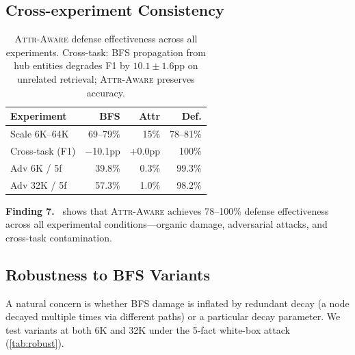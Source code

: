 \documentclass{article}
\newcommand{\attraware}{\textsc{Attr-Aware}}
\newcommand{\finding}[1]{\vspace{2pt}\noindent\textbf{Finding #1.}~}
\begin{document}
\subsection{Cross-experiment Consistency}

\begin{table}[htbp]
\centering
\footnotesize
\begin{tabular}{lrrr}
\toprule
\textbf{Experiment} & \textbf{BFS} & \textbf{Attr} & \textbf{Def.} \\
\midrule
Scale 6K--64K & 69--79\% & 15\% & 78--81\% \\
Cross-task (F1) & $-$10.1pp & +0.0pp & 100\% \\
Adv 6K / 5f & 39.8\% & 0.3\% & 99.3\% \\
Adv 32K / 5f & 57.3\% & 1.0\% & 98.2\% \\
\bottomrule
\end{tabular}
\caption{\attraware{} defense effectiveness across all experiments. Cross-task: BFS propagation from hub entities degrades F1 by $10.1\pm1.6$pp on unrelated retrieval; \attraware{} preserves accuracy.}
\label{tab:defense_all}
\end{table}

\finding{7}  shows that \attraware{} achieves 78--100\% defense effectiveness across all experimental conditions---organic damage, adversarial attacks, and cross-task contamination.

\subsection{Robustness to BFS Variants}

A natural concern is whether BFS damage is inflated by redundant decay (a node decayed multiple times via different paths) or a particular decay parameter.
We test variants at both 6K and 32K under the 5-fact white-box attack (\cref{tab:robust}).
\end{document}
